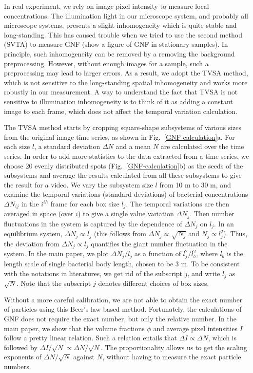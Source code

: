 In real experiment, we rely on image pixel intensity to measure local concentrations. The illumination light in our microscope system, and probably all microscope systems, presents a slight inhomogeneity which is quite stable and long-standing. This has caused trouble when we tried to use the second method (SVTA) to measure GNF (show a figure of GNF in stationary samples). In principle, such inhomogeneity can be removed by a removing the background preprocessing. However, without enough images for a sample, such a preprocessing may lead to larger errors. As a result, we adopt the TVSA method, which is not sensitive to the long-standing spatial inhomogeneity and works more robustly in our measurement. A way to understand the fact that TVSA is not sensitive to illumination inhomogeneity is to think of it as adding a constant image to each frame, which does not affect the temporal variation calculation.

The TVSA method starts by cropping square-shape subsystems of various sizes from the original image time series, as shown in Fig.~\ref{GNF-calculation}a. For each size $l$, a standard deviation $\Delta N$ and a mean $N$ are calculated over the time series. In order to add more statistics to the data extracted from a time series, we choose 20 evenly distributed spots (Fig.~\ref{GNF-calculation}b) as the seeds of the subsystems and average the results calculated from all these subsystems to give the result for a video. We vary the subsystem size $l$ from 10 \textmu m to 30 \textmu m, and examine the temporal variations (standard deviations) of bacterial concentrations $\Delta N_{ij}$ in the $i^{th}$ frame for each box size $l_j$. The temporal variations are then averaged in space (over $i$) to give a single value variation $\Delta N_{j}$.
Then number fluctuations in the system is captured by the dependence of $\Delta N_{j}$ on $l_j$. In an equilibrium system, $\Delta N_{j}\propto l_j$ (this follows from $\Delta N_{j}\propto \sqrt{N_j}$ and $N_j\propto l_j^2$).
Thus, the deviation from $\Delta N_{j}\propto l_j$ quantifies the giant number fluctuation in the system.
In the main paper, we plot $\Delta N_{j}/l_j$ as a function of $l_j^2/l_b^2$, where $l_b$ is the length scale of single bacterial body length, chosen to be 3 \textmu m.
To be consistent with the notations in literatures, we get rid of the subscript $j$, and write $l_j$ as $\sqrt{N}$.
Note that the subscript $j$ denotes different choices of box sizes.

Without a more careful calibration, we are not able to obtain the exact number of particles using this Beer's law based method. Fortunately, the calculations of GNF does not require the exact number, but only the relative number. In the main paper, we show that the volume fractions $\phi$ and average pixel intensities $I$ follow a pretty linear relation. Such a relation entails that $\Delta I \propto \Delta N$, which is followed by $\Delta I/\sqrt N \propto \Delta N/\sqrt N$. The proportionality allows us to get the scaling exponents of $\Delta N/\sqrt N$ against $N$, without having to measure the exact particle numbers.

